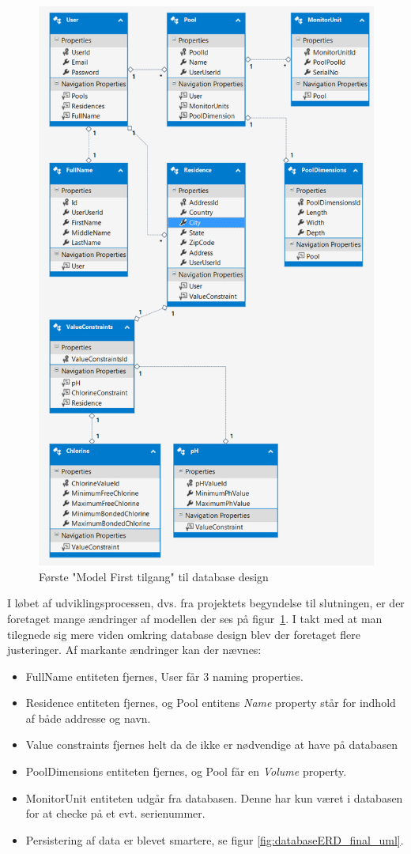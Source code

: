 \begin{figure}[H]
	\centering
	\includegraphics[width=0.8\linewidth]{figs/design/databaseERD}
	\caption{Første "Model First tilgang" til database design}
	\label{fig:databaseERD_firstattempt_uml}
\end{figure}

I løbet af udviklingsprocessen, dvs. fra projektets begyndelse til slutningen, er der foretaget mange ændringer af modellen der ses på figur~\ref{fig:databaseERD_firstattempt_uml}. 
I takt med at man tilegnede sig mere viden omkring database design blev der foretaget flere justeringer. Af markante ændringer kan der nævnes:

\begin{itemize}
	\item FullName entiteten fjernes, User får 3 naming properties.
	\item Residence entiteten fjernes, og Pool entitens \textit{Name} property står for indhold af både addresse og navn.
	\item Value constraints fjernes helt da de ikke er nødvendige at have på databasen
	\item PoolDimensions entiteten fjernes, og Pool får en \textit{Volume} property.
	\item MonitorUnit entiteten udgår fra databasen. Denne har kun været i databasen for at checke på et evt. serienummer.
	\item Persistering af data er blevet smartere, se figur \ref{fig:databaseERD_final_uml}.
\end{itemize}

